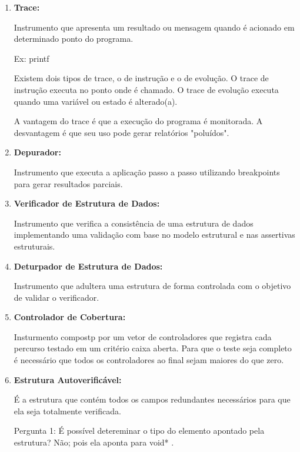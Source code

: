 \documentclass[
	12pt, %
]{fphw}
\begin{document}
\begin{doublespace}
\begin{enumerate}[label=\textbf{\arabic*)}]
        \item \textbf{Trace:}
        
              Instrumento que apresenta um resultado ou mensagem quando é acionado em determinado ponto do programa.
              
              Ex: printf

              Existem dois tipos de trace, o de instrução e o de evolução. O trace de instrução executa no ponto onde é chamado. O trace de evolução executa quando uma variável ou estado é alterado(a).
              
              A vantagem do trace é que a execução do programa é monitorada. A desvantagem é que seu uso pode gerar relatórios "poluídos".

        \item \textbf{Depurador:}
        
              Instrumento que executa a aplicação passo a passo utilizando breakpoints para gerar resultados parciais.

        \item \textbf{Verificador de Estrutura de Dados:}
        
              Instrumento que verifica a consistência de uma estrutura de dados implementando uma validação com base no modelo estrutural e nas assertivas estruturais.

        \item \textbf{Deturpador de Estrutura de Dados:}
        
              Instrumento que adultera uma estrutura de forma controlada com o objetivo de validar o verificador.

        \item \textbf{Controlador de Cobertura:}
        
              Insturmento compostp por um vetor de controladores que registra cada percurso testado em um critério caixa aberta. Para que o teste seja completo é necessário que todos os controladores ao final sejam maiores do que zero.

        \item \textbf{Estrutura Autoverificável:}
        
              É a estrutura que contém todos os campos redundantes necessários para que ela seja totalmente verificada.

              Pergunta 1: É possível detereminar o tipo do elemento apontado pela estrutura? Não; pois ela aponta para void* .


\end{enumerate}
\end{doublespace}
\end{document}
